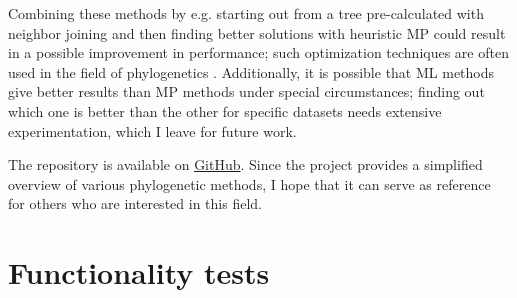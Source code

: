 \documentclass[11pt,twocolumn]{article}
\begin{document}
Combining these methods by e.g. starting out from a tree pre-calculated with neighbor joining and then finding better solutions with heuristic MP could result in a possible improvement in performance; such optimization techniques are often used in the field of phylogenetics \cite{Zvelebil2007}. Additionally, it is possible that ML methods give better results than MP methods under special circumstances; finding out which one is better than the other for specific datasets needs extensive experimentation, which I leave for future work.

The repository is available on \href{https://github.com/Leena01/computational_biology}{GitHub}. Since the project provides a simplified overview of various phylogenetic methods, I hope that it can serve as reference for others who are interested in this field.

\newpage
\hypersetup{
	urlcolor=black
}



\newpage
\appendix
\section{Functionality tests}
\end{document}
